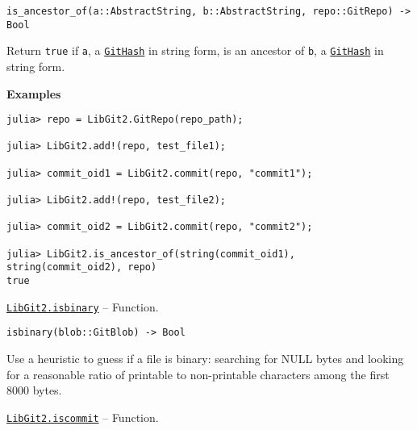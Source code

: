 \begin{adjustwidth}{2em}{0pt}


\begin{verbatim}
is_ancestor_of(a::AbstractString, b::AbstractString, repo::GitRepo) -> Bool
\end{verbatim}

Return \texttt{true} if \texttt{a}, a \hyperlink{202290709580230708}{\texttt{GitHash}} in string form, is an ancestor of \texttt{b}, a \hyperlink{202290709580230708}{\texttt{GitHash}} in string form.

\textbf{Examples}


\begin{verbatim}
julia> repo = LibGit2.GitRepo(repo_path);

julia> LibGit2.add!(repo, test_file1);

julia> commit_oid1 = LibGit2.commit(repo, "commit1");

julia> LibGit2.add!(repo, test_file2);

julia> commit_oid2 = LibGit2.commit(repo, "commit2");

julia> LibGit2.is_ancestor_of(string(commit_oid1), string(commit_oid2), repo)
true
\end{verbatim}



\end{adjustwidth}
\hypertarget{404822283933661526}{} 
\hyperlink{404822283933661526}{\texttt{LibGit2.isbinary}}  -- {Function.}

\begin{adjustwidth}{2em}{0pt}


\begin{verbatim}
isbinary(blob::GitBlob) -> Bool
\end{verbatim}

Use a heuristic to guess if a file is binary: searching for NULL bytes and looking for a reasonable ratio of printable to non-printable characters among the first 8000 bytes.



\end{adjustwidth}
\hypertarget{12031902939660672720}{} 
\hyperlink{12031902939660672720}{\texttt{LibGit2.iscommit}}  -- {Function.}

